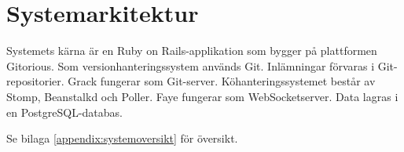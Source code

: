 \section{Systemarkitektur}
Systemets kärna är en Ruby on Rails-applikation som bygger på plattformen Gitorious. Som versionhanteringssystem används Git. Inlämningar förvaras i Git-repositorier. Grack fungerar som Git-server. Köhanteringssystemet består av Stomp, Beanstalkd och Poller. Faye fungerar som WebSocketserver. Data lagras i en PostgreSQL-databas.

Se bilaga \ref{appendix:systemoversikt} för översikt.
